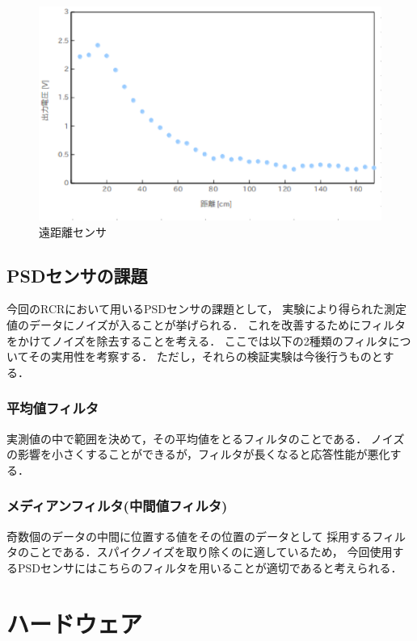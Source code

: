 \documentclass[10pt,a4j]{jarticle}
\begin{document}
\begin{figure}[H]
  \begin{center}
    \includegraphics[width=1.0\hsize]{picture/psdf.eps}
    \caption{遠距離センサ}
    \label{psdf}
  \end{center}
\end{figure}


\newpage
\subsection{PSDセンサの課題}
今回のRCRにおいて用いるPSDセンサの課題として，
実験により得られた測定値のデータにノイズが入ることが挙げられる．
これを改善するためにフィルタをかけてノイズを除去することを考える．
ここでは以下の2種類のフィルタについてその実用性を考察する．
ただし，それらの検証実験は今後行うものとする．

\subsubsection{平均値フィルタ}
実測値の中で範囲を決めて，その平均値をとるフィルタのことである．
ノイズの影響を小さくすることができるが，フィルタが長くなると応答性能が悪化する．

\subsubsection{メディアンフィルタ(中間値フィルタ)}
奇数個のデータの中間に位置する値をその位置のデータとして
採用するフィルタのことである．スパイクノイズを取り除くのに適しているため，
今回使用するPSDセンサにはこちらのフィルタを用いることが適切であると考えられる．

\section{ハードウェア}
\end{document}
